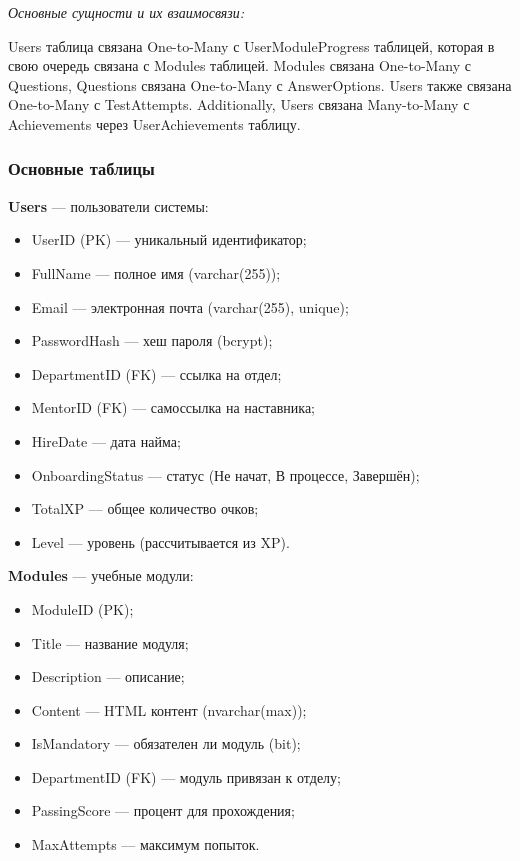 \textit{Основные сущности и их взаимосвязи:}

Users таблица связана One-to-Many с UserModuleProgress таблицей, которая в свою очередь связана с Modules таблицей. Modules связана One-to-Many с Questions, Questions связана One-to-Many с AnswerOptions. Users также связана One-to-Many с TestAttempts. Additionally, Users связана Many-to-Many с Achievements через UserAchievements таблицу.

\subsubsection{Основные таблицы}

\textbf{Users} --- пользователи системы:
\begin{itemize}
    \item UserID (PK) --- уникальный идентификатор;
    \item FullName --- полное имя (varchar(255));
    \item Email --- электронная почта (varchar(255), unique);
    \item PasswordHash --- хеш пароля (bcrypt);
    \item DepartmentID (FK) --- ссылка на отдел;
    \item MentorID (FK) --- самоссылка на наставника;
    \item HireDate --- дата найма;
    \item OnboardingStatus --- статус (Не начат, В процессе, Завершён);
    \item TotalXP --- общее количество очков;
    \item Level --- уровень (рассчитывается из XP).
\end{itemize}

\textbf{Modules} --- учебные модули:
\begin{itemize}
    \item ModuleID (PK);
    \item Title --- название модуля;
    \item Description --- описание;
    \item Content --- HTML контент (nvarchar(max));
    \item IsMandatory --- обязателен ли модуль (bit);
    \item DepartmentID (FK) --- модуль привязан к отделу;
    \item PassingScore --- процент для прохождения;
    \item MaxAttempts --- максимум попыток.
\end{itemize}

